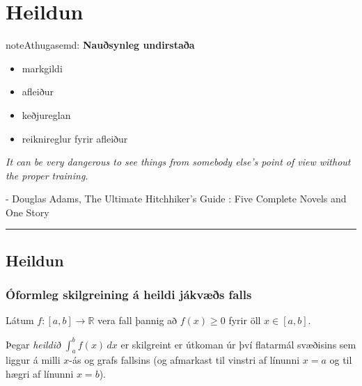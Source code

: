 \documentclass[a4paper,10pt,icelandic]{sphinxmanual}
\begin{document}


\chapter{Heildun}
\label{kafli06:heildun}\label{kafli06::doc}
\begin{notice}{note}{Athugasemd:}
\textbf{Nauðsynleg undirstaða}
\begin{itemize}
\item {} 
markgildi

\item {} 
afleiður

\item {} 
keðjureglan

\item {} 
reiknireglur fyrir afleiður

\end{itemize}
\end{notice}

\emph{It can be very dangerous to see things from somebody else's point of view without the proper training.}

- Douglas Adams, The Ultimate Hitchhiker's Guide : Five Complete Novels and One Story


\bigskip\hrule{}\bigskip



\section{Heildun}
\label{kafli06:id1}

\subsection{Óformleg skilgreining á heildi jákvæðs falls}
\label{kafli06:oformleg-skilgreining-a-heildi-jakvaes-falls}
Látum \(f:[a,b]\rightarrow {{\mathbb  R}}\) vera fall þannig að
\(f(x)\geq 0\) fyrir öll \(x\in[a,b]\).

Þegar \textit{heildið} \(\int_a^b f(x)\,dx\) er skilgreint er útkoman úr því
flatarmál svæðisins sem liggur á milli \(x\)-ás og grafs fallsins
(og afmarkast til vinstri af línunni \(x=a\) og til hægri af línunni
\(x=b\)).
\end{document}
